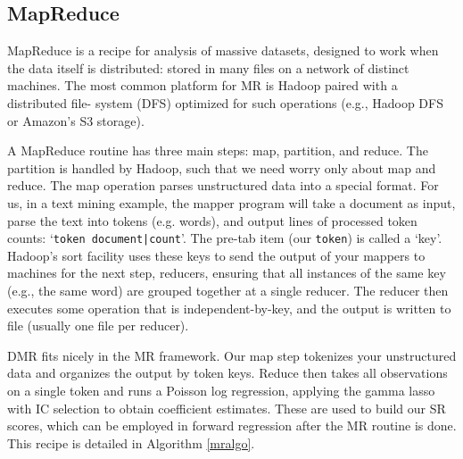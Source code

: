 \documentclass[12pt]{article}
\newcommand{\cd}[1]{{\tt#1}}
\begin{document}
\subsection{MapReduce} 
\label{MR}

  MapReduce \citep[MR;][]{dean_mapreduce:_2004} is a  recipe
for analysis of massive datasets, designed to work when the data itself is
distributed: stored in many files on a network of distinct machines.
The most common platform for  MR is Hadoop paired with a distributed file-
system (DFS)  optimized for such operations (e.g., Hadoop DFS or
Amazon's S3 storage).

A MapReduce routine has three main steps: map, partition, and reduce.  The
partition  is handled by Hadoop, such that we need worry only
about map and reduce.  The map operation parses  unstructured data into a
special format.  For us, in a text mining example, the mapper program will
take a document as input, parse the text into tokens (e.g. words), and output
lines of processed token counts: `\cd{token   document|count}'.  The pre-tab
item (our \cd{token}) is called a `key'.  Hadoop's sort facility uses these
keys to send the output of your mappers to machines for the next step,
reducers, ensuring that all instances of the same key (e.g., the same word)
are grouped together at a single reducer.  The reducer then executes some
operation that is independent-by-key, and the output is written to file
(usually one file per reducer).

DMR fits nicely in the MR framework.  Our map step tokenizes your unstructured data  and organizes the output by token keys.  Reduce then takes all observations on a single token and runs a Poisson log regression, applying the gamma lasso with IC selection to obtain coefficient estimates.  These are used to build our SR scores, which can be employed in forward regression after the MR routine is done.  This recipe is detailed in Algorithm \ref{mralgo}.
\end{document}
